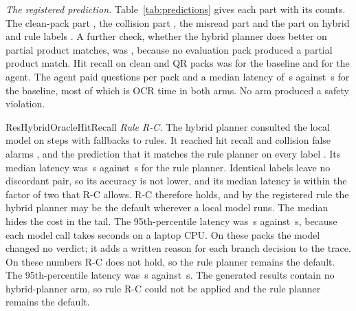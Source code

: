 \emph{The registered prediction.} Table~\ref{tab:predictions} gives each part with its counts. The clean-pack part , the collision part , the misread part  and the part on hybrid and rule labels . A further check, whether the hybrid planner does better on partial product matches, was , because no evaluation pack produced a partial product match. Hit recall on clean and QR packs was  for the baseline and  for the agent. The agent paid  questions per pack and a median latency of \,s against \,s for the baseline, most of which is OCR time in both arms. No arm produced a safety violation.

\ifcsname ResHybridOracleHitRecall\endcsname
\emph{Rule R-C.} The hybrid planner consulted the local model on  steps with  fallbacks to rules. It reached hit recall  and collision false alarms , and the prediction that it matches the rule planner on every label . Its median latency was \,s against \,s for the rule planner.
\ifRCholds
Identical labels leave no discordant pair, so its accuracy is not lower, and its median latency is within the factor of two that R-C allows. R-C therefore holds, and by the registered rule the hybrid planner may be the default wherever a local model runs. The median hides the cost in the tail. The 95th-percentile latency was \,s against \,s, because each model call takes seconds on a laptop CPU. On these packs the model changed no verdict; it adds a written reason for each branch decision to the trace.
\else
On these numbers R-C does not hold, so the rule planner remains the default. The 95th-percentile latency was \,s against \,s.
\fi
\else
The generated results contain no hybrid-planner arm, so rule R-C could not be applied and the rule planner remains the default.
\fi
\else
{}
\fi

